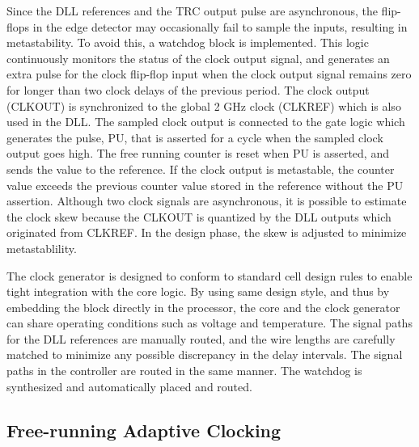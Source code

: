 \documentclass[graybox]{svmult}
\begin{document}
Since the DLL references and the TRC output pulse are asynchronous, the flip-flops in the edge detector may occasionally fail to sample the inputs, resulting in metastability.
To avoid this, a watchdog block is implemented.
This logic continuously monitors the status of the clock output signal, and generates an extra pulse for the clock flip-flop input when the clock output signal remains zero for longer than two clock delays of the previous period.
The clock output (CLKOUT) is synchronized to the global 2 GHz clock (CLKREF) which is also used in the DLL.
The sampled clock output is connected to the gate logic which generates the pulse, PU, that is asserted for a cycle when the sampled clock output goes high.
The free running counter is reset when PU is asserted, and sends the value to the reference.
If the clock output is metastable, the counter value exceeds the previous counter value stored in the reference without the PU assertion.
Although two clock signals are asynchronous, it is possible to estimate the clock skew because the CLKOUT is quantized by the DLL outputs which originated from CLKREF.
In the design phase, the skew is adjusted to minimize metastablility.

The clock generator is designed to conform to standard cell design rules to enable tight integration with the core logic.
By using same design style, and thus by embedding the block directly in the processor, the core and the clock generator can share operating conditions such as voltage and temperature.
The signal paths for the DLL references are manually routed, and the wire lengths are carefully matched to minimize any possible discrepancy in the delay intervals. The signal paths in the controller are routed in the same manner.
The watchdog is synthesized and automatically placed and routed.

\subsection{Free-running Adaptive Clocking}
\end{document}

